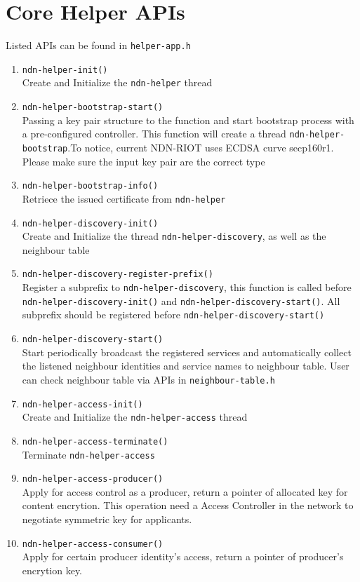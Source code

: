 \documentclass[a4paper, 11pt]{article}
\begin{document}
    \section{Core Helper APIs}
    Listed APIs can be found in \texttt{helper-app.h}
    \begin{enumerate}
    \item \texttt{ndn-helper-init()} \\
    Create and Initialize the \texttt{ndn-helper} thread 
    \item \texttt{ndn-helper-bootstrap-start()} \\
    Passing a key pair structure to the function and start bootstrap process with a pre-configured controller. This function will create a thread \texttt{ndn-helper-bootstrap}.To notice, current NDN-RIOT uses ECDSA curve secp160r1. Please make sure the input key pair are the correct type
    \item \texttt{ndn-helper-bootstrap-info()} \\ 
    Retriece the issued certificate from \texttt{ndn-helper}
    \item \texttt{ndn-helper-discovery-init()} \\
    Create and Initialize the thread \texttt{ndn-helper-discovery}, as well as the neighbour table
    \item \texttt{ndn-helper-discovery-register-prefix()} \\
    Register a subprefix to \texttt{ndn-helper-discovery}, this function is called before \texttt{ndn-helper-discovery-init()} and \texttt{ndn-helper-discovery-start()}. All subprefix should be registered before \texttt{ndn-helper-discovery-start()}
    \item \texttt{ndn-helper-discovery-start()} \\
    Start periodically broadcast the registered services and automatically collect the listened neighbour identities and service names to neighbour table. User can check neighbour table via APIs in \texttt{neighbour-table.h}
    \item \texttt{ndn-helper-access-init()} \\
    Create and Initialize the \texttt{ndn-helper-access} thread 
    \item \texttt{ndn-helper-access-terminate()} \\
    Terminate \texttt{ndn-helper-access}
    \item \texttt{ndn-helper-access-producer()} \\
    Apply for access control as a producer, return a pointer of allocated key for content encrytion. This operation need a Access Controller in the network to negotiate symmetric key for applicants.
    \item \texttt{ndn-helper-access-consumer()} \\
    Apply for certain producer identity's access, return a pointer of producer's encrytion key.
    \end{enumerate}
    
\end{document}
